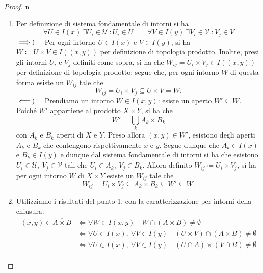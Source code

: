 \begin{proof}{n}~{}
	\begin{enumerate}[label=\Roman*]
		\item Per definizione di sistema fondamentale di intorni si ha
		\begin{equation*}
			\forall U\in I(x)\ \exists U_i\in\mathcal{U}\ \colon U_i\in U\qquad
			\forall V\in I(y)\ \exists V_i\in\mathcal{V}\ \colon V_j\in V
		\end{equation*}
		$\implies)\quad$ Per ogni intorno $U\in I(x)$ e $V\in I(y)$, si ha $W\coloneqq U\times V\in I\left((x,y)\right)$ per definizione di topologia prodotto. Inoltre, presi gli intorni $U_i$ e $V_j$ definiti come sopra, si ha che $W_{ij} = U_i \times V_j\in I\left((x,y)\right)$ per definizione di topologia prodotto; segue che, per ogni intorno $W$ di questa forma esiste un $W_{ij}$ tale che
		\begin{equation*}
			W_{ij} = U_i \times V_j\subseteq U\times V= W.
		\end{equation*}
		$\impliedby)\quad$ Prendiamo un intorno $W\in I(x,y)$: esiste un aperto $W'\subseteq W$. Poiché $W'$ appartiene al prodotto $X\times Y$, si ha che
		\begin{equation*}
			W'=\bigcup_k A_k\times B_k
		\end{equation*}
		con $A_k$ e $B_k$ aperti di $X$ e $Y$. Preso allora $(x,y)\in W'$, esistono degli aperti $A_k$ e $B_k$ che contengono rispettivamente $x$ e $y$.	Segue dunque che $A_k\in I(x)$ e $B_k\in I(y)$ e dunque dal sistema fondamentale di intorni si ha che esistono $ U_i\in\mathcal{U},\ V_j\in\mathcal{V}$ tali che $U_i\in A_k,\ V_j\in B_k$. Allora definito $W_{ij} \coloneqq U_i \times V_j$, si ha per ogni intorno $W$ di $X\times Y$ esiste un $W_{ij}$ tale che
		\begin{equation*}
			W_{ij} = U_i \times V_j\subseteq A_k\times B_k\subseteq W'\subseteq W.
		\end{equation*}
		\item Utilizziamo i risultati del punto 1. con la caratterizzazione per intorni della chiusura:
		\begin{align*}
			(x,y)\in \overline{A\times B}&\iff \forall W\in I(x,y)\quad W\cap\left(A\times B\right)\neq \emptyset\\
			&\iff \forall U\in I(x),\ \forall V\in I(y)\quad \left(U\times V\right)\cap\left(A\times B\right)\neq \emptyset\\
			&\iff \forall U\in I(x),\ \forall V\in I(y)\quad \left(U\cap A\right)\times\left(V\cap B\right)\neq \emptyset\\

\end{align*}
\end{enumerate}
\end{proof}
